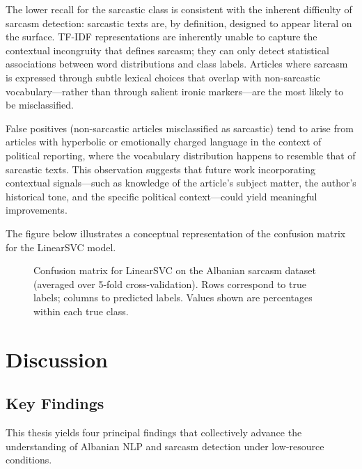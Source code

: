 \documentclass[12pt,a4paper]{article}
\begin{document}
The lower recall for the sarcastic class is consistent with the inherent difficulty of sarcasm detection: sarcastic texts are, by definition, designed to appear literal on the surface. TF-IDF representations are inherently unable to capture the contextual incongruity that defines sarcasm; they can only detect statistical associations between word distributions and class labels. Articles where sarcasm is expressed through subtle lexical choices that overlap with non-sarcastic vocabulary---rather than through salient ironic markers---are the most likely to be misclassified.

False positives (non-sarcastic articles misclassified as sarcastic) tend to arise from articles with hyperbolic or emotionally charged language in the context of political reporting, where the vocabulary distribution happens to resemble that of sarcastic texts. This observation suggests that future work incorporating contextual signals---such as knowledge of the article's subject matter, the author's historical tone, and the specific political context---could yield meaningful improvements.

The figure below illustrates a conceptual representation of the confusion matrix for the LinearSVC model.

\begin{figure}[H]
    \centering
    \fbox{\rule{0pt}{5cm}\rule{9cm}{0pt}}
    \caption{Confusion matrix for LinearSVC on the Albanian sarcasm dataset (averaged over 5-fold cross-validation). Rows correspond to true labels; columns to predicted labels. Values shown are percentages within each true class.}
    \label{fig:confusion_matrix}
\end{figure}

\newpage
\section{Discussion}
\label{sec:discussion}

\subsection{Key Findings}
\label{subsec:findings}

This thesis yields four principal findings that collectively advance the understanding of Albanian NLP and sarcasm detection under low-resource conditions.
\end{document}
